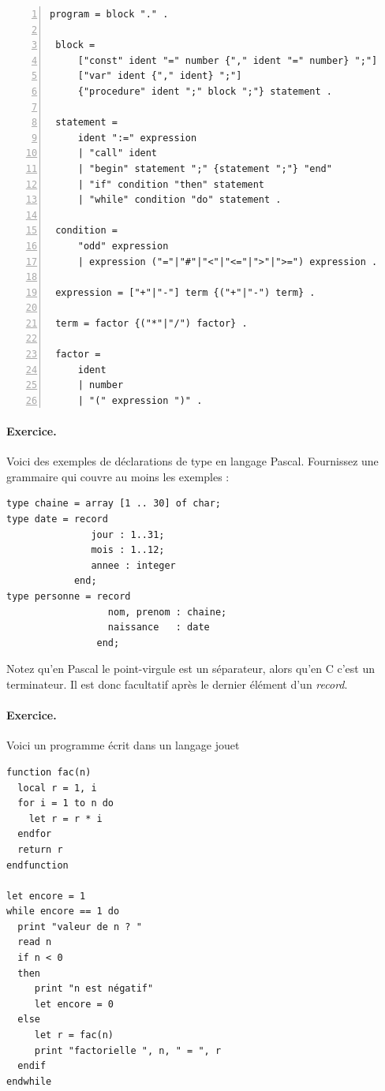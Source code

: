 {\small
\begin{lstlisting}[frame=single,numbers=left]
 program = block "." .
 
 block =
     ["const" ident "=" number {"," ident "=" number} ";"]
     ["var" ident {"," ident} ";"]
     {"procedure" ident ";" block ";"} statement .
 
 statement =
     ident ":=" expression
     | "call" ident
     | "begin" statement ";" {statement ";"} "end"
     | "if" condition "then" statement
     | "while" condition "do" statement .
 
 condition =
     "odd" expression
     | expression ("="|"#"|"<"|"<="|">"|">=") expression .
 
 expression = ["+"|"-"] term {("+"|"-") term} .
 
 term = factor {("*"|"/") factor} .

 factor =
     ident
     | number
     | "(" expression ")" .

\end{lstlisting}

\paragraph{Exercice.} Voici des exemples de déclarations de type en 
langage Pascal. Fournissez une grammaire qui couvre au moins
les exemples :

\begin{verbatim}
type chaine = array [1 .. 30] of char;
type date = record 
               jour : 1..31;
               mois : 1..12;
               annee : integer
            end;
type personne = record
                  nom, prenom : chaine;
                  naissance   : date
                end;
\end{verbatim}
Notez qu'en Pascal le point-virgule est un séparateur, alors qu'en C c'est un 
terminateur. Il est donc facultatif après le dernier élément d'un \emph{record}.

                   
\paragraph{Exercice. } Voici un programme écrit dans un langage jouet
\begin{verbatim}
function fac(n)
  local r = 1, i
  for i = 1 to n do
    let r = r * i
  endfor
  return r
endfunction

let encore = 1
while encore == 1 do
  print "valeur de n ? "
  read n
  if n < 0 
  then 
     print "n est négatif"
     let encore = 0
  else 
     let r = fac(n)
     print "factorielle ", n, " = ", r
  endif
endwhile  
\end{verbatim}

}
